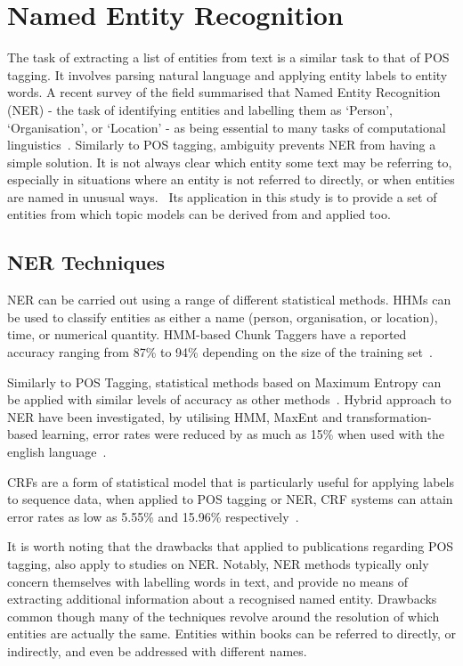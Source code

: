 \documentclass[10pt]{report}
\begin{document}
\section{Named Entity Recognition}
The task of extracting a list of entities from text is a similar task to that of POS tagging. It involves parsing natural language and applying entity labels to entity words. A recent survey of the field summarised that Named Entity Recognition (NER) - the task of identifying entities and labelling them as ‘Person’, ‘Organisation’, or ‘Location’ - as being essential to many tasks of computational linguistics~\cite{Nadeau2007-tp}. Similarly to POS tagging, ambiguity prevents NER from having a simple solution. It is not always clear which entity some text may be referring to, especially in situations where an entity is not referred to directly, or when entities are named in unusual ways.~\cite{Ratinov2009-gw} Its application in this study is to provide a set of entities from which topic models can be derived from and applied too. 

\subsection{NER Techniques}
NER can be carried out using a range of different statistical methods. HHMs can be used to classify entities as either a name (person, organisation, or location), time, or numerical quantity. HMM-based Chunk Taggers have a reported accuracy ranging from 87\% to 94\% depending on the size of the training set~\cite{Zhou2002-st}.

Similarly to POS Tagging, statistical methods based on Maximum Entropy can be applied with similar levels of accuracy as other methods~\cite{Borthwick1999-tg,Bender2003-lc}. Hybrid approach to NER have been investigated, by utilising HMM, MaxEnt and transformation-based learning, error rates were reduced by as much as 15\% when used with the english language~\cite{Tjong_Kim2003-ym}.

CRFs are a form of statistical model that is particularly useful for applying labels to sequence data, when applied to POS tagging or NER, CRF systems can attain error rates as low as 5.55\% and 15.96\% respectively~\cite{Lafferty2001-ab,McCallum2003-yu}.

 It is worth noting that the drawbacks that applied to publications regarding POS tagging, also apply to studies on NER. Notably, NER methods typically only concern themselves with labelling words in text, and provide no means of extracting additional information about a recognised named entity. Drawbacks common though many of the techniques revolve around the resolution of which entities are actually the same. Entities within books can be referred to directly, or indirectly, and even be addressed with different names. 
\end{document}
